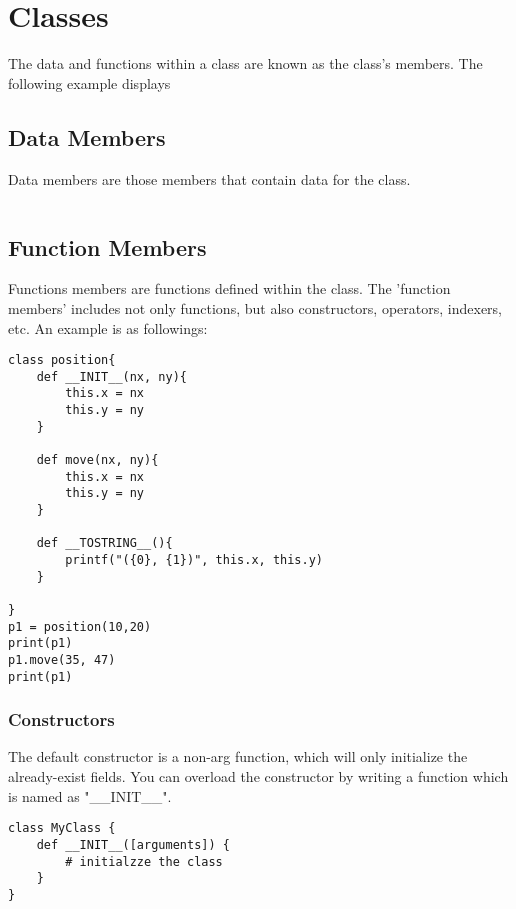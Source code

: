 \chapter{Classes}
The data and functions within a class are known as the class's members.
The following example displays
\section{Data Members}
Data members are those members that contain data for the class.
\begin{lstlisting}
\end{lstlisting}

\section{Function Members}
Functions members are functions defined within the class. The 'function members' includes not only functions, but also constructors, operators, indexers, etc. An example is as followings:
% 
% 
% 

\begin{lstlisting}
class position{
	def __INIT__(nx, ny){
		this.x = nx
		this.y = ny
	}
	
	def move(nx, ny){
		this.x = nx
		this.y = ny
	}
	
	def __TOSTRING__(){
		printf("({0}, {1})", this.x, this.y)
	}
	
}
p1 = position(10,20)
print(p1)
p1.move(35, 47)
print(p1)
\end{lstlisting}	


\subsection{Constructors}
The default constructor is a non-arg function, which will only initialize the already-exist fields. You can overload the constructor by writing a function which is named as "\_\_INIT\_\_".

\begin{lstlisting}
class MyClass {
	def __INIT__([arguments]) {
		# initialzze the class
	}
}
\end{lstlisting}

